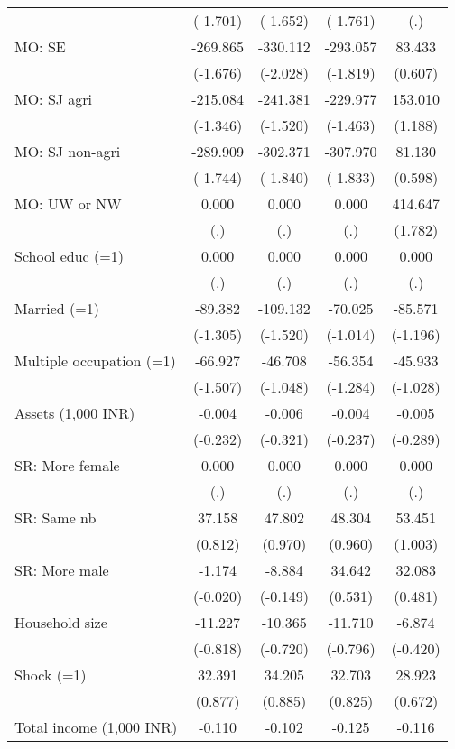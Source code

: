 \begin{table}[htbp]
{\begin{tabular}{lcccc}
          & (-1.701) & (-1.652) & (-1.761) & (.) \\
    MO: SE & -269.865 & -330.112 & -293.057 & 83.433 \\
          & (-1.676) & (-2.028) & (-1.819) & (0.607) \\
    MO: SJ agri & -215.084 & -241.381 & -229.977 & 153.010 \\
          & (-1.346) & (-1.520) & (-1.463) & (1.188) \\
    MO: SJ non-agri & -289.909 & -302.371 & -307.970 & 81.130 \\
          & (-1.744) & (-1.840) & (-1.833) & (0.598) \\
    MO: UW or NW & 0.000 & 0.000 & 0.000 & 414.647 \\
          & (.)   & (.)   & (.)   & (1.782) \\
    School educ (=1) & 0.000 & 0.000 & 0.000 & 0.000 \\
          & (.)   & (.)   & (.)   & (.) \\
    Married (=1) & -89.382 & -109.132 & -70.025 & -85.571 \\
          & (-1.305) & (-1.520) & (-1.014) & (-1.196) \\
    Multiple occupation (=1) & -66.927 & -46.708 & -56.354 & -45.933 \\
          & (-1.507) & (-1.048) & (-1.284) & (-1.028) \\
    Assets (1,000 INR) & -0.004 & -0.006 & -0.004 & -0.005 \\
          & (-0.232) & (-0.321) & (-0.237) & (-0.289) \\
    SR: More female & 0.000 & 0.000 & 0.000 & 0.000 \\
          & (.)   & (.)   & (.)   & (.) \\
    SR: Same nb & 37.158 & 47.802 & 48.304 & 53.451 \\
          & (0.812) & (0.970) & (0.960) & (1.003) \\
    SR: More male & -1.174 & -8.884 & 34.642 & 32.083 \\
          & (-0.020) & (-0.149) & (0.531) & (0.481) \\
    Household size & -11.227 & -10.365 & -11.710 & -6.874 \\
          & (-0.818) & (-0.720) & (-0.796) & (-0.420) \\
    Shock (=1) & 32.391 & 34.205 & 32.703 & 28.923 \\
          & (0.877) & (0.885) & (0.825) & (0.672) \\
    Total income (1,000 INR) & -0.110 & -0.102 & -0.125 & -0.116 \\

\end{tabular}}
\end{table}
